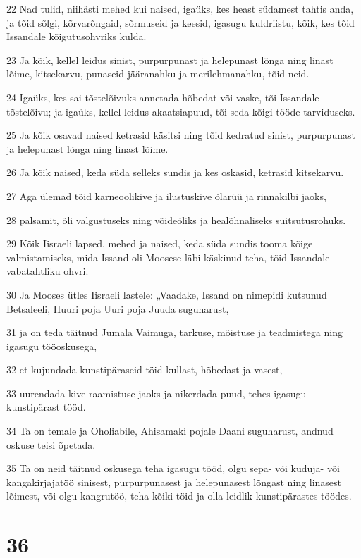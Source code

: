 \par 22 Nad tulid, niihästi mehed kui naised, igaüks, kes heast südamest tahtis anda, ja tõid sõlgi, kõrvarõngaid, sõrmuseid ja keesid, igasugu kuldriistu, kõik, kes tõid Issandale kõigutusohvriks kulda.
\par 23 Ja kõik, kellel leidus sinist, purpurpunast ja helepunast lõnga ning linast lõime, kitsekarvu, punaseid jääranahku ja merilehmanahku, tõid neid.
\par 24 Igaüks, kes sai tõstelõivuks annetada hõbedat või vaske, tõi Issandale tõstelõivu; ja igaüks, kellel leidus akaatsiapuud, tõi seda kõigi tööde tarviduseks.
\par 25 Ja kõik osavad naised ketrasid käsitsi ning tõid kedratud sinist, purpurpunast ja helepunast lõnga ning linast lõime.
\par 26 Ja kõik naised, keda süda selleks sundis ja kes oskasid, ketrasid kitsekarvu.
\par 27 Aga ülemad tõid karneoolikive ja ilustuskive õlarüü ja rinnakilbi jaoks,
\par 28 palsamit, õli valgustuseks ning võideõliks ja healõhnaliseks suitsutusrohuks.
\par 29 Kõik Iisraeli lapsed, mehed ja naised, keda süda sundis tooma kõige valmistamiseks, mida Issand oli Moosese läbi käskinud teha, tõid Issandale vabatahtliku ohvri.
\par 30 Ja Mooses ütles Iisraeli lastele: „Vaadake, Issand on nimepidi kutsunud Betsaleeli, Huuri poja Uuri poja Juuda suguharust,
\par 31 ja on teda täitnud Jumala Vaimuga, tarkuse, mõistuse ja teadmistega ning igasugu tööoskusega,
\par 32 et kujundada kunstipäraseid töid kullast, hõbedast ja vasest,
\par 33 uurendada kive raamistuse jaoks ja nikerdada puud, tehes igasugu kunstipärast tööd.
\par 34 Ta on temale ja Oholiabile, Ahisamaki pojale Daani suguharust, andnud oskuse teisi õpetada.
\par 35 Ta on neid täitnud oskusega teha igasugu tööd, olgu sepa- või kuduja- või kangakirjajatöö sinisest, purpurpunasest ja helepunasest lõngast ning linasest lõimest, või olgu kangrutöö, teha kõiki töid ja olla leidlik kunstipärastes töödes.

\chapter{36}

